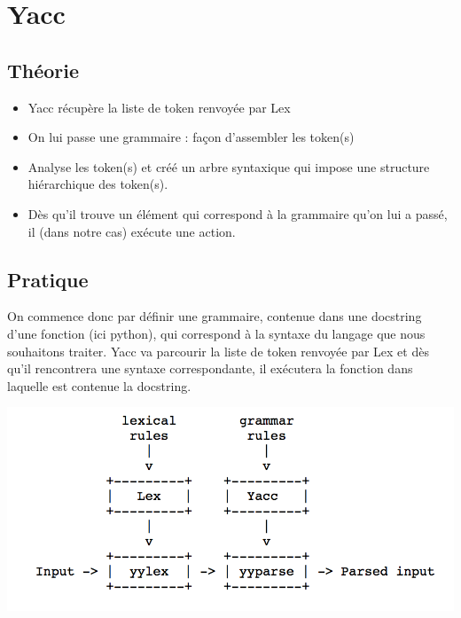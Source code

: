 \documentclass[a4paper,12pt]{article}
\begin{document}
\section{Yacc}

	\subsection{Théorie}
	\begin{itemize}
		\item Yacc récupère la liste de token renvoyée par Lex
		\item On lui passe une grammaire : façon d'assembler les token(s)
		\item Analyse les token(s) et créé un arbre syntaxique qui impose une structure hiérarchique des token(s).
		\item Dès qu'il trouve un élément qui correspond à la grammaire qu'on lui a passé, il (dans notre cas) exécute une action.
	\end{itemize}	 	
	
	\subsection{Pratique}
	
	On commence donc par définir une grammaire, contenue dans une docstring d'une fonction (ici python), qui correspond à la syntaxe du langage que nous souhaitons traiter. Yacc va parcourir la liste de token renvoyée par Lex et dès qu'il rencontrera une syntaxe correspondante, il exécutera la fonction dans laquelle est contenue la docstring. 
	
	\includegraphics[scale=1]{images/schema_lex_yacc}
\end{document}
